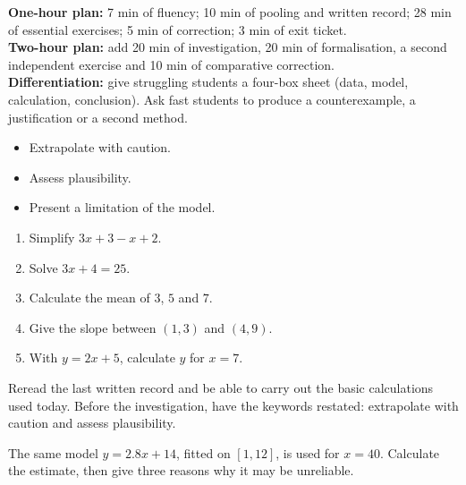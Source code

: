 \ifprof
\begin{methode}
\textbf{One-hour plan:} 7 min of fluency; 10 min of pooling and written record; 28 min of essential exercises; 5 min of correction; 3 min of exit ticket.\\
\textbf{Two-hour plan:} add 20 min of investigation, 20 min of formalisation, a second independent exercise and 10 min of comparative correction.\\
\textbf{Differentiation:} give struggling students a four-box sheet (data, model, calculation, conclusion). Ask fast students to produce a counterexample, a justification or a second method.
\end{methode}
\fi
{}
\begin{objectifs}\begin{itemize}\item Extrapolate with caution.\item Assess plausibility.\item Present a limitation of the model.\end{itemize}\end{objectifs}
\begin{automatismes}\begin{enumerate}\item Simplify $3x+3-x+2$. \item Solve $3x+4=25$. \item Calculate the mean of $3$, $5$ and $7$. \item Give the slope between $(1,3)$ and $(4,9)$. \item With $y=2x+5$, calculate $y$ for $x=7$. \end{enumerate}\end{automatismes}
\begin{prerequis}Reread the last written record and be able to carry out the basic calculations used today. Before the investigation, have the keywords restated: extrapolate with caution and assess plausibility.\end{prerequis}

\begin{activite}
The same model $y=2.8x+14$, fitted on $[1,12]$, is used for $x=40$. Calculate the estimate, then give three reasons why it may be unreliable.
\begin{center}\end{center}
\end{activite}


